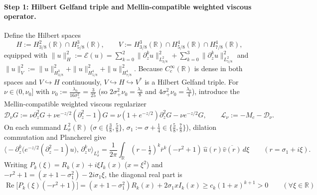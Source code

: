 \documentclass[11pt,a4paper]{article}
\begin{document}
\paragraph{Step 1: Hilbert Gelfand triple and Mellin-compatible weighted viscous operator.}
Define the Hilbert spaces
\[
H := H^2_{3/8}(\mathbb{R}) \cap H^3_{5/8}(\mathbb{R}), \qquad V := H^3_{3/8}(\mathbb{R}) \cap H^4_{5/8}(\mathbb{R}) \cap H^4_{7/8}(\mathbb{R}),
\]
equipped with $\|u\|_H^2 := \mathcal{E}(u) = \sum_{k=0}^2\|\partial_z^k u\|_{L^2_{3/8}}^2 + \sum_{k=0}^3\|\partial_z^k u\|_{L^2_{5/8}}^2$ and $\|u\|_V^2 := \|u\|_{H^3_{3/8}}^2 + \|u\|_{H^4_{5/8}}^2 + \|u\|_{H^4_{7/8}}^2$. Because $C_c^\infty(\mathbb{R})$ is dense in both spaces and $V \hookrightarrow H$ continuously, $V \hookrightarrow H \hookrightarrow V^*$ is a Hilbert Gelfand triple. For $\nu \in (0, \nu_0]$ with $\nu_0 := \frac{\lambda_0}{16\sigma_+^2} = \frac{3}{25}$ (so $2\sigma_+^2\nu_0 = \frac{\lambda_0}{8}$ and $4\sigma_+^2\nu_0 = \frac{\lambda_0}{4}$), introduce the Mellin-compatible weighted viscous regularizer
\begin{equation}\label{eq:D_nu}
\mathcal{D}_\nu G := \nu\partial_z^2 G + \nu e^{-z/2}(\partial_z^2 - 1)G = \nu(1 + e^{-z/2})\partial_z^2 G - \nu e^{-z/2} G, \qquad \mathcal{L}_\nu := -M_c - \mathcal{D}_\nu.
\end{equation}
On each summand $L^2_\sigma(\mathbb{R})$ ($\sigma \in \{\frac{3}{8}, \frac{5}{8}\}$, $\sigma_1 := \sigma + \frac{1}{4} \in \{\frac{5}{8}, \frac{7}{8}\}$), dilation commutation and Plancherel give
\[
\big\langle -\partial_z^k\!\big(e^{-z/2}(\partial_z^2 - 1)u\big),\,\partial_z^k v\big\rangle_{L^2_\sigma}
= \frac{1}{2\pi}\int_{\mathbb{R}} (r - \tfrac{1}{2})^k\bar r^k(-r^2 + 1)\,\widehat{u}(r)\overline{\widehat{v}(r)}\,d\xi \qquad (r = \sigma_1 + i\xi).
\]
Writing $P_k(\xi) = R_k(x) + i\xi I_k(x)$ ($x = \xi^2$) and $-r^2 + 1 = (x + 1 - \sigma_1^2) - 2i\sigma_1\xi$, the diagonal real part is
\[
\operatorname{Re}\!\big[P_k(\xi)(-r^2 + 1)\big] = (x + 1 - \sigma_1^2)R_k(x) + 2\sigma_1 x I_k(x) \ge c_k(1 + x)^{k+1} > 0 \qquad (\forall \xi \in \mathbb{R})
\]
\end{document}
